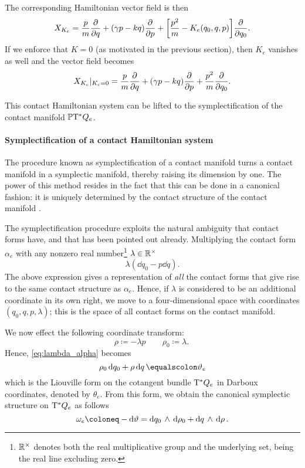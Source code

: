 The corresponding Hamiltonian vector field is then
\begin{equation}
    X_{K_e} = \frac{p}{m}\pdv{}{q} + (\gamma p - kq) \pdv{}{p} + \qty[\frac{p^2}{m} - K_e(q_0, q, p)]\pdv{}{q_0}. 
    \label{eq:ham_vf_e}
\end{equation}
If we enforce that $K = 0$ (as motivated in the previous section), then $K_e$ vanishes as well and the vector field becomes 
\begin{equation}
    X_{K_e}\vert_{K_e = 0} = \frac{p}{m}\pdv{}{q} + (\gamma p - kq) \pdv{}{p} + \frac{p^2}{m}\pdv{}{q_0}.
    \label{eq:ham_vf_e_liouville}
\end{equation}

This contact Hamiltonian system can be lifted to the symplectification of the contact manifold $\mathbb{P}\mathrm{T}^* Q_e$.

\paragraph{Symplectification of a contact Hamiltonian system} The procedure known as symplectification of a contact manifold turns a contact manifold in a symplectic manifold, thereby raising its dimension by one. The power of this method resides in the fact that this can be done in a canonical fashion: it is uniquely determined by the contact structure of the contact manifold \cite{Arnold1989}.

The symplectification procedure exploits the natural ambiguity that contact forms have, and that has been pointed out already. Multiplying the contact form $\alpha_e$ with any nonzero real number\footnote
{
    $\mathbb{R}^\times$ denotes both the real multiplicative group and the underlying set, being the real line excluding zero. 
} $\lambda \in \mathbb{R}^\times$
\begin{equation}
    \lambda (\dd{q_0} - p \dd{q}). 
    \label{eq:lambda_alpha}
\end{equation}
The above expression gives a representation of \emph{all} the contact forms that give rise to the same contact structure as $\alpha_e$. Hence, if $\lambda$ is considered to be an additional coordinate in its own right, we move to a four-dimensional space with coordinates $(q_0, q, p, \lambda)$; this is the space of all contact forms on the contact manifold. 

We now effect the following coordinate transform:
$$ \rho \coloneq -\lambda p \qquad \rho_0 \coloneq \lambda. \ $$ 
Hence, \cref{eq:lambda_alpha} becomes 
\begin{equation}
    \rho_0\dd{q_0} + \rho \dd{q} \equalscolon \theta_e
    \label{eq:liouville_form_extended}
\end{equation}
which is the Liouville form on the cotangent bundle $\mathrm{T}^*Q_e$ in Darboux coordinates, denoted by $\theta_e$. From this form, we obtain the canonical symplectic structure on 
$\mathrm{T}^*Q_e$ as follows
\begin{equation}
    \omega_e \coloneq -\dd{\theta} = \wedgep{\dd{q_0}}{\dd{\rho_0}} + \wedgep{\dd{q}}{\dd{\rho}}.
    \label{eq:symplectic_form_extended}
\end{equation}

